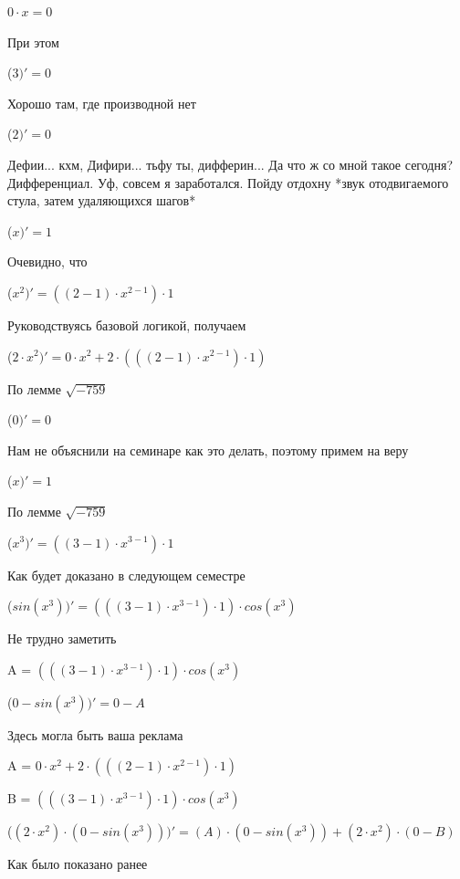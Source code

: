 \documentclass[12pt,a4paper,fleqn]{article}
\begin{document}
\begin{center}
$0 \cdot x = 0$\end{center}
При этом

\begin{center}
 ($3)'
  = 0$\end{center}
Хорошо там, где производной нет\cite{link2}

\begin{center}
 ($2)'
  = 0$\end{center}
Дефии... кхм, Дифири... тьфу ты, дифферин... Да что ж со мной такое сегодня? Дифференциал. Уф, совсем я заработался. Пойду отдохну *звук отодвигаемого стула, затем удаляющихся шагов*

\begin{center}
 ($x)'
  = 1$\end{center}
Очевидно, что

\begin{center}
 ($x^{2})'
  = ((2-1) \cdot x^{2-1}) \cdot 1$\end{center}
Руководствуясь базовой логикой, получаем

\begin{center}
 ($2 \cdot x^{2})'
  = 0 \cdot x^{2}+2 \cdot (((2-1) \cdot x^{2-1}) \cdot 1)$\end{center}
По лемме $\sqrt{-759}$
\begin{center}
 ($0)'
  = 0$\end{center}
Нам не объяснили на семинаре как это делать, поэтому примем на веру

\begin{center}
 ($x)'
  = 1$\end{center}
По лемме $\sqrt{-759}$
\begin{center}
 ($x^{3})'
  = ((3-1) \cdot x^{3-1}) \cdot 1$\end{center}
Как будет доказано в следующем семестре

\begin{center}
 ($sin(x^{3}))'
  = (((3-1) \cdot x^{3-1}) \cdot 1) \cdot cos(x^{3})$\end{center}
Не трудно заметить

\begin{center}
A = $(((3-1) \cdot x^{3-1}) \cdot 1) \cdot cos(x^{3})$\end{center}
\begin{center}
 ($0-sin(x^{3}))'
  = 0-A$\end{center}
Здесь могла быть ваша реклама

\begin{center}
A = $0 \cdot x^{2}+2 \cdot (((2-1) \cdot x^{2-1}) \cdot 1)$\end{center}
\begin{center}
B = $(((3-1) \cdot x^{3-1}) \cdot 1) \cdot cos(x^{3})$\end{center}
\begin{center}
 ($(2 \cdot x^{2}) \cdot (0-sin(x^{3})))'
  = (A) \cdot (0-sin(x^{3}))+(2 \cdot x^{2}) \cdot (0-B)$\end{center}
Как было показано ранее
\end{document}
